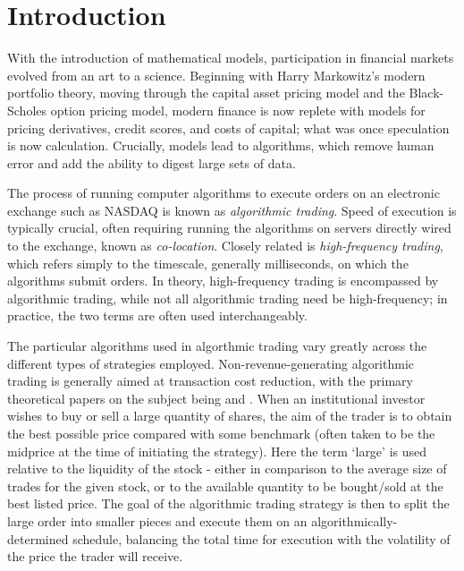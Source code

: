 \chapter{Introduction}

With the introduction of mathematical models, participation in financial markets evolved from an art to a science. Beginning with Harry Markowitz's modern portfolio theory, moving through the capital asset pricing model and the Black-Scholes option pricing model, modern finance is now replete with models for pricing derivatives, credit scores, and costs of capital; what was once speculation is now calculation. Crucially, models lead to algorithms, which remove human error and add the ability to digest large sets of data. 

The process of running computer algorithms to execute orders on an electronic exchange such as NASDAQ is known as \emph{algorithmic trading}. Speed of execution is typically crucial, often requiring running the algorithms on servers directly wired to the exchange, known as \emph{co-location}. Closely related is \emph{high-frequency trading}, which refers simply to the timescale, generally milliseconds, on which the algorithms submit orders. In theory, high-frequency trading is encompassed by algorithmic trading, while not all algorithmic trading need be high-frequency; in practice, the two terms are often used interchangeably. 

The particular algorithms used in algorthmic trading vary greatly across the different types of strategies employed. Non-revenue-generating algorithmic trading is generally aimed at transaction cost reduction, with the primary theoretical papers on the subject being \citet{Bertsimas98} and \citet{Almgren01}. When an institutional investor wishes to buy or sell a large quantity of shares, the aim of the trader is to obtain the best possible price compared with some benchmark (often taken to be the midprice at the time of initiating the strategy). Here the term `large' is used relative to the liquidity of the stock - either in comparison to the average size of trades for the given stock, or to the available quantity to be bought/sold at the best listed price. The goal of the algorithmic trading strategy is then to split the large order into smaller pieces and execute them on an algorithmically-determined schedule, balancing the total time for execution with the volatility of the price the trader will receive. 

